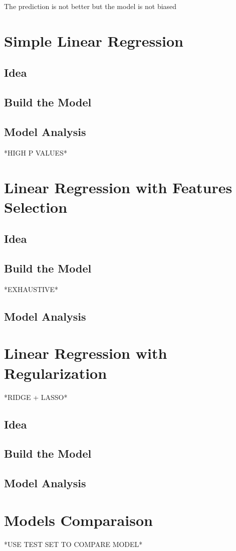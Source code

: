 \documentclass[]{report}
\begin{document}
The prediction is not better but the model is not biased

\section{Simple Linear Regression}
\subsection{Idea}

\subsection{Build the Model} 

\subsection{Model Analysis}
*HIGH P VALUES*

\section{Linear Regression with Features Selection}
\subsection{Idea}

\subsection{Build the Model}
*EXHAUSTIVE*
\subsection{Model Analysis}

\section{Linear Regression with Regularization}

*RIDGE + LASSO*
\subsection{Idea}

\subsection{Build the Model}

\subsection{Model Analysis}



\section{Models Comparaison}
*USE TEST SET TO COMPARE MODEL*
\end{document}
